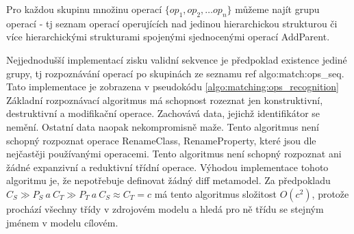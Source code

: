 \documentclass[11pt,twoside,a4paper]{book}
\begin{document}
 Pro každou skupinu množinu operací $\{op_1, op_2, \ldots op_n\}$ můžeme najít
 grupu operací - tj seznam operací operujících nad jedinou hierarchickou
 strukturou či více hierarchickými strukturami spojenými sjednocenými operací
 AddParent.
 
 Nejjednodušší implementací zisku validní sekvence je předpoklad existence
 jediné grupy, tj rozpoznávání operací po skupinách ze seznamu 
 ref algo:match:ops\_seq. Tato implementace je zobrazena v pseudokódu \ref{algo:matching:ops_recognition}
 \\
 Základní rozpoznávací algoritmus má schopnost rozeznat jen konstruktivní,
 destruktivní a modifikační operace. Zachovává data, jejichž identifikátor se
 nemění.
 Ostatní data naopak nekompromisně maže. Tento algoritmus není schopný
 rozpoznat operace RenameClass, RenameProperty, které jsou dle \cite{Luksch}
 nejčastěji používanými operacemi. Tento algoritmus není schopný
 rozpoznat ani žádné expanzivní a reduktivní třídní operace. Výhodou
 implementace tohoto algoritmu je, že nepotřebuje definovat žádný diff
 metamodel. Za předpokladu $C_S \gg P_S \ a\ C_T \gg P_T \ a\  C_S \approx C_T =
 c$ má tento algoritmus složitost $O(c^2)$, protože
 prochází všechny třídy v zdrojovém modelu a hledá pro ně třídu se stejným
 jménem v modelu cílovém.
 
 
\end{document}
